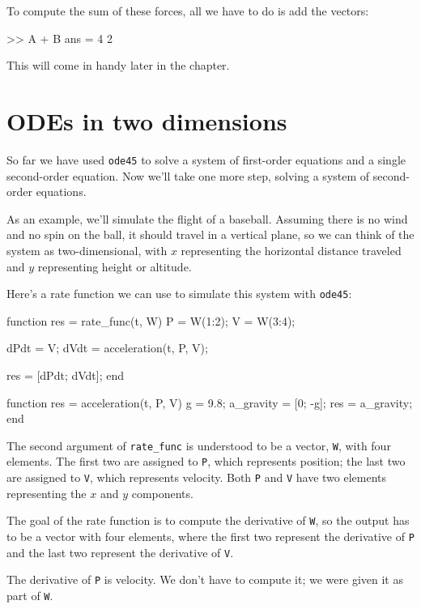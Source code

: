 \documentclass[
]{book}
\numberwithin{Answer}{chapter}
\numberwithin{Exercise}{chapter}
\begin{document}
To compute the sum of these forces, all we have to do is add the vectors:

\begin{code}
>> A + B
ans = 4     2
\end{code}

This will come in handy later in the chapter.


\section{ODEs in two dimensions}
\label{sect:projectile}

So far we have used {\tt ode45} to solve a system of first-order equations and a single second-order equation.  Now we'll take one more step, solving a system of second-order equations.

As an example, we'll simulate the flight of a baseball.
Assuming there is no wind and no spin on the ball, it should travel in a vertical plane, so we can think of the system as
two-dimensional, with $x$ representing the horizontal distance
traveled and $y$ representing height or altitude.

Here's a rate function we can use to simulate this system with {\tt ode45}:

\begin{code}
function res = rate_func(t, W)
    P = W(1:2);
    V = W(3:4);

    dPdt = V;
    dVdt = acceleration(t, P, V);

    res = [dPdt; dVdt];
end

function res = acceleration(t, P, V)
    g = 9.8;             %
    a_gravity = [0; -g];
    res = a_gravity;
end
\end{code}

The second argument of \verb"rate_func" is understood to be a vector,
{\tt W}, with four elements.  The first two are assigned to {\tt P},
which represents position; the last two are assigned to {\tt V}, which
represents velocity. Both {\tt P} and {\tt V} have two elements
representing the $x$ and $y$ components.

The goal of the rate function is to compute the derivative of {\tt W}, so the output has to be a vector with four elements, where the first two represent the derivative of {\tt P}  and the last two represent the derivative of {\tt V}.

The derivative of {\tt P} is velocity.  We don't have to compute it; we were given it as part of {\tt W}.
\end{document}
